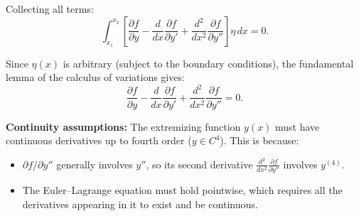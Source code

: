 \documentclass[12pt]{article}
\begin{document}
Collecting all terms:
\[
  \int_{x_1}^{x_2} \left[\frac{\partial f}{\partial y} - \frac{d}{dx}\frac{\partial f}{\partial y'} + \frac{d^2}{dx^2}\frac{\partial f}{\partial y''}\right] \eta\,dx = 0.
\]

Since $\eta(x)$ is arbitrary (subject to the boundary conditions), the fundamental lemma of the calculus of variations gives:
\[
  \boxed{\frac{\partial f}{\partial y} - \frac{d}{dx}\frac{\partial f}{\partial y'} + \frac{d^2}{dx^2}\frac{\partial f}{\partial y''} = 0.}
\]

\medskip
\noindent\textbf{Continuity assumptions:} The extremizing function $y(x)$ must have continuous derivatives up to fourth order ($y \in C^4$). This is because:
\begin{itemize}
  \item $\partial f/\partial y''$ generally involves $y''$, so its second derivative $\frac{d^2}{dx^2}\frac{\partial f}{\partial y''}$ involves $y^{(4)}$.
  \item The Euler--Lagrange equation must hold pointwise, which requires all the derivatives appearing in it to exist and be continuous.
\end{itemize}
\end{document}
